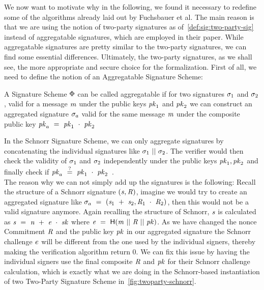We now want to motivate why in the following, we found it necessary to redefine some of the algorithms already laid out by Fuchsbauer et al.
The main reason is that we are using the notion of two-party signatures as of~\cref{def:sig:two-party-sig} instead of aggregatable signatures, which are employed in their paper.
While aggregatable signatures are pretty similar to the two-party signatures, we can find some essential differences.
Ultimately, the two-party signatures, as we shall see, the more appropriate and secure choice for the formalization.
First of all, we need to define the notion of an Aggregatable Signature Scheme:
\begin{definition} \label{def:atom:aggsig}
    A Signature Scheme $\Phi$ can be called aggregatable if for two signatures $\sigma_1$ and $\sigma_2$, valid for a message $\mathit{m}$ under the public keys $\mathit{pk}_1$ and $\mathit{pk}_2$ we can construct an aggregated signature $\sigma_a$ valid for the same message $\mathit{m}$ under the composite public key $\mathit{pk}_a ~=~ \mathit{pk}_1 ~\cdot~ \mathit{pk}_2$
\end{definition}
In the Schnorr Signature Scheme, we can only aggregate signatures by concatenating the individual signatures like $\sigma_1 ~||~ \sigma_2$.
The verifier would then check the validity of $\sigma_1$ and $\sigma_2$ independently under the public keys $\mathit{pk}_1, \mathit{pk}_2$ and finally check if $\mathit{pk}_a ~\stackrel{?}{=}~ \mathit{pk}_1 ~\cdot~ \mathit{pk}_2$~\cite{fuchsbauer2019aggregate}. \\
The reason why we can not simply add up the signatures is the following:
Recall the structure of a Schnorr signature $(\mathit{s}, \mathit{R})$, imagine we would try to create an aggregated signature like $\sigma_a ~=~ (\mathit{s}_1 ~+~ \mathit{s}_2, \mathit{R}_1 ~\cdot~ \mathit{R}_2)$, then this would not be a valid signature anymore.
Again recalling the structure of Schnorr, $\mathit{s}$ is calculated as $\mathit{s} ~=~ \mathit{n} ~+~ \mathit{e} ~\cdot~ \mathit{sk}$ where $\mathit{e} ~=~ \mathsf{H} (\mathit{m} ~||~ \mathit{R} ~||~ \mathit{pk})$.
As we have changed the nonce Commitment $\mathit{R}$ and the public key $\mathit{pk}$ in our aggregated signature the Schnorr challenge $\mathit{e}$ will be different from the one used by the individual signers, thereby making the verification algorithm return 0.
We can fix this issue by having the individual signers use the final composite $\mathit{R}$ and $\mathit{pk}$ for their Schnorr challenge calculation, which is exactly what we are doing in the Schnorr-based instantiation of two Two-Party Signature Scheme in~\cref{fig:twoparty-schnorr}.
